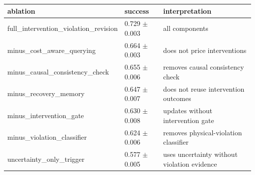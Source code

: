 \begin{tabular}{lll}
\toprule
ablation & success & interpretation \\
\midrule
full\_intervention\_violation\_revision & 0.729 $\pm$ 0.003 & all components \\
minus\_cost\_aware\_querying & 0.664 $\pm$ 0.003 & does not price interventions \\
minus\_causal\_consistency\_check & 0.655 $\pm$ 0.006 & removes causal consistency check \\
minus\_recovery\_memory & 0.647 $\pm$ 0.007 & does not reuse intervention outcomes \\
minus\_intervention\_gate & 0.630 $\pm$ 0.008 & updates without intervention gate \\
minus\_violation\_classifier & 0.624 $\pm$ 0.006 & removes physical-violation classifier \\
uncertainty\_only\_trigger & 0.577 $\pm$ 0.005 & uses uncertainty without violation evidence \\
\bottomrule
\end{tabular}
